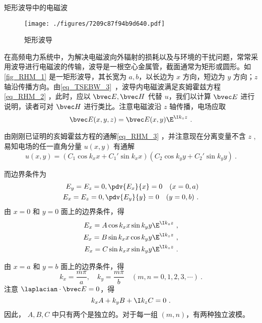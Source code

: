 \begin{example}{矩形波导中的电磁波}
\begin{figure}[ht]
\centering
\texttt{[image: ./figures/7209c87f94b9d640.pdf]}
\caption{矩形波导} \label{fig_RHM_1}
\end{figure}
在高频电力系统中，为解决电磁波向外辐射的损耗以及与环境的干扰问题，常常采用波导进行电磁波的传输，波导是一根空心金属管，截面通常为矩形或圆形。如\autoref{fig_RHM_1} 是一矩形波导，其长宽为 $a,b$，以长边为 $x$ 方向，短边为 $y$ 方向；$z$ 轴沿传播方向。由\autoref{eq_TSEBW_3}~，波导内电磁波满足亥姆霍兹方程\autoref{eq_RHM_2} ，此时，应以 $\bvec E,\bvec H$ 代替 $u$，我们以计算 $\bvec E$ 进行说明，读者可对 $\bvec H$ 进行类比。注意电磁波沿 $z$ 轴传播，电场应取
\begin{equation}
\bvec E(x,y,z)=\bvec E(x,y)\E^{\I k_z z}~.
\end{equation}

由刚刚已证明的亥姆霍兹方程的通解\autoref{eq_RHM_3} ，并注意现在分离变量不含 $z$ ,易知电场的任一直角分量 $u(x,y)$ 有通解
\begin{equation}
u(x,y)=(C_1\cos k_xx+C_1'\sin k_xx)(C_2\cos k_yy+C_2'\sin k_yy)~.
\end{equation}

而边界条件为
\begin{equation}
\begin{aligned}
E_y=E_z=0,\pdv{E_x}{x}=0\quad(x=0,a)\\
E_x=E_z=0,\pdv{E_y}{y}=0\quad(y=0,b)~.
\end{aligned}
\end{equation}
由 $x=0$ 和 $y=0$ 面上的边界条件，得
\begin{equation}\begin{aligned}
E_x=A\cos k_x x\sin k_yy\E^{\I k_zz}~, \\
E_x=B\sin k_x x\cos k_yy\E^{\I k_zz}~, \\
E_x=C\sin k_x x\sin k_yy\E^{\I k_zz}~.
\end{aligned}\end{equation}
 
由 $x=a$ 和 $y=b$ 面上的边界条件，得 
\begin{equation}
k_x=\frac{m\pi}{a},\quad k_y=\frac{m\pi}{b}\quad(m,n=0,1,2,3,\cdots)~.
\end{equation}
注意 $\laplacian \cdot\bvec E=0$，得
\begin{equation}
k_xA+k_yB+\I k_zC=0~.
\end{equation}
因此， $A,B,C$ 中只有两个是独立的。对于每一组 $(m,n)$，有两种独立波模。
\end{example}
